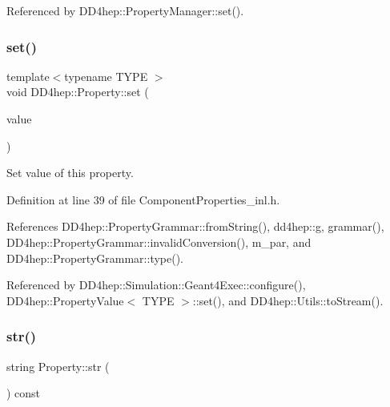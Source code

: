Referenced by D\+D4hep\+::\+Property\+Manager\+::set().

\hypertarget{class_d_d4hep_1_1_property_a77f106d95462fad8c938a9568941854e}{}\label{class_d_d4hep_1_1_property_a77f106d95462fad8c938a9568941854e} 
\subsubsection{\texorpdfstring{set()}{set()}}
{\footnotesize\ttfamily template$<$typename T\+Y\+PE $>$ \\
void D\+D4hep\+::\+Property\+::set (\begin{DoxyParamCaption}\item[{const T\+Y\+PE \&}]{value }\end{DoxyParamCaption})}



Set value of this property. 



Definition at line 39 of file Component\+Properties\+\_\+inl.\+h.



References D\+D4hep\+::\+Property\+Grammar\+::from\+String(), dd4hep\+::g, grammar(), D\+D4hep\+::\+Property\+Grammar\+::invalid\+Conversion(), m\+\_\+par, and D\+D4hep\+::\+Property\+Grammar\+::type().



Referenced by D\+D4hep\+::\+Simulation\+::\+Geant4\+Exec\+::configure(), D\+D4hep\+::\+Property\+Value$<$ T\+Y\+P\+E $>$\+::set(), and D\+D4hep\+::\+Utils\+::to\+Stream().

\hypertarget{class_d_d4hep_1_1_property_aa1e6042a1251c6544fcfef41b3ff5f47}{}\label{class_d_d4hep_1_1_property_aa1e6042a1251c6544fcfef41b3ff5f47} 
\subsubsection{\texorpdfstring{str()}{str()}\hspace{0.1cm}{\footnotesize\ttfamily [1/2]}}
{\footnotesize\ttfamily string Property\+::str (\begin{DoxyParamCaption}{ }\end{DoxyParamCaption}) const}



